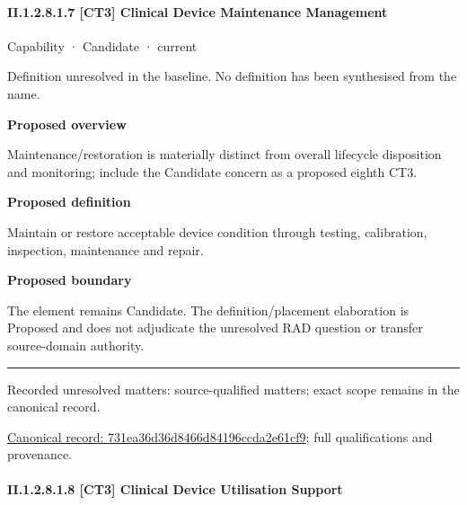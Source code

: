 \paragraph*{II.1.2.8.1.7 [CT3] Clinical Device Maintenance Management}
\label{navigation:II.1.2.8.1.7}

\label{element:731ea36d36d8466d84196ccda2e61cf9}
{\small Capability · Candidate · current}\par

Definition unresolved in the baseline. No definition has been synthesised from the name.



\textbf{Proposed overview}



Maintenance/restoration is materially distinct from overall lifecycle disposition and monitoring; include the Candidate concern as a proposed eighth CT3.



\textbf{Proposed definition}



Maintain or restore acceptable device condition through testing, calibration, inspection, maintenance and repair.



\textbf{Proposed boundary}



The element remains Candidate. The definition/placement elaboration is Proposed and does not adjudicate the unresolved RAD question or transfer source-domain authority.



\medskip\hrule\medskip

{\small Recorded unresolved matters: source-qualified matters; exact scope remains in the canonical record.}\par
{\footnotesize \href{../../../../continuum/strategy/capability/731ea36d36d8466d84196ccda2e61cf9.md}{Canonical record: 731ea36d36d8466d84196ccda2e61cf9}; full qualifications and provenance.}\par
\paragraph*{II.1.2.8.1.8 [CT3] Clinical Device Utilisation Support}
\label{navigation:II.1.2.8.1.8}

